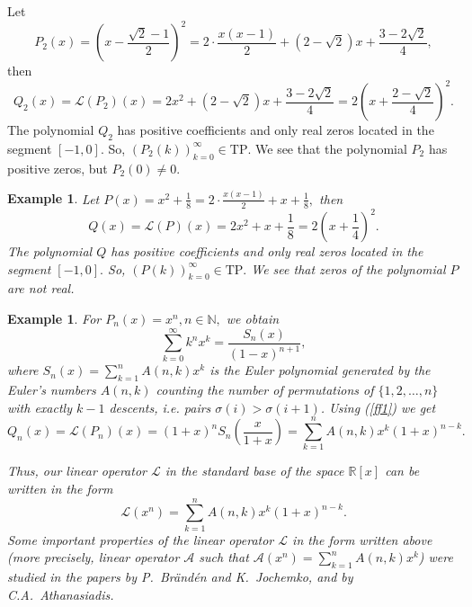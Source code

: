 \documentclass[12pt]{amsart}
\newcounter{count}
\numberwithin{count}{section}
\newtheorem{Example}[count]{Example}
\begin{document}
Let
$$P_2(x)= \left(x - \frac{\sqrt{2} -1}{2}\right)^2 = 2\cdot \frac{x(x-1)}{2}+(2- \sqrt{2}) x + 
\frac{3-2\sqrt{2}}{4},$$
then
$$ Q_2(x)= \mathcal{L}(P_2)(x) = 2x^2 +  (2 -\sqrt{2})x + 
\frac{3-2\sqrt{2}}{4}= 2\left(x + \frac{2-\sqrt{2}}{4}  \right)^2. $$
The polynomial $ Q_2$  has positive coefficients and only real zeros located in the segment $[-1, 0].$
So, $(P_2(k))_{k=0}^\infty \in \mathrm{TP}.$ We see that the polynomial  $P_2$ has positive zeros, 
but $P_2(0) \ne 0.$ 

\begin{Example}
\label{ex2a}  
Let $P(x)= x^2 + \frac{1}{8} = 2\cdot \frac{x(x-1)}{2}+ x + \frac{1}{8},$
then
$$ Q(x)= \mathcal{L}(P)(x) = 2x^2 + x + \frac{1}{8}=2\left(x+\frac{1}{4}\right)^2. $$
The polynomial $ Q$  has positive coefficients and only real zeros located in the segment $[-1, 0].$
So, $(P(k))_{k=0}^\infty \in \mathrm{TP}.$ We see that zeros of the polynomial  $P$ are not real.
\end{Example}

\begin{Example}
\label{ex2b} 
For $P_n(x) =x^n, n\in \mathbb{N},$ we obtain
$$ \sum_{k=0}^\infty k^n x^k = \frac{S_n(x)}{(1-x)^{n+1}},   $$
where $S_n(x) =\sum_{k=1}^{n}A(n,k)x^k$ is the Euler polynomial generated 
by the Euler's numbers $A(n,k)$ counting the number of permutations 
of  $\{1,2,\ldots, n\}$  with exactly $k-1$ descents, i.e. pairs $\sigma(i)>\sigma(i+1)$.
Using (\ref{ff1}) we get
$$Q_n(x)= \mathcal{L}(P_n)(x) =   (1+x)^n S_n\left(\frac{x}{1+x}\right) =
\sum_{k=1}^{n}A(n,k)x^k(1+x)^{n-k}.$$

Thus, our linear operator $\mathcal{L}$ in the standard  base of the space $\mathbb{R}[x]$
can be written in the form
$$\mathcal{L}(x^n) = \sum_{k=1}^{n}A(n,k)x^k(1+x)^{n-k}.$$
Some important properties of the linear operator $\mathcal{L}$ in the  form
written above  (more precisely, linear operator $\mathcal{A}$ such that $\mathcal{A}(x^n) 
= \sum_{k=1}^{n}A(n,k)x^k$) were studied in  the papers \cite{branden} by P.~Br\"and\'en
and K.~Jochemko, and \cite{athan} by C.A.~Athanasiadis.

\end{Example} 
\end{document}
